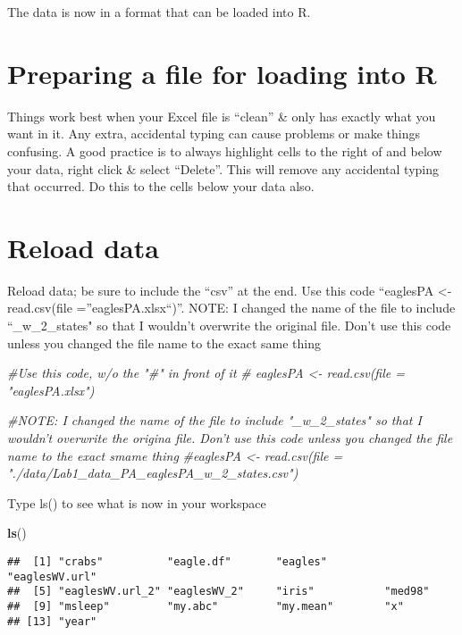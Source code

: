\documentclass[]{book}
\newenvironment{Shaded}{\begin{snugshade}}{\end{snugshade}}
\newcommand{\KeywordTok}[1]{\textcolor[rgb]{0.13,0.29,0.53}{\textbf{#1}}}
\newcommand{\CommentTok}[1]{\textcolor[rgb]{0.56,0.35,0.01}{\textit{#1}}}
\newcommand{\NormalTok}[1]{#1}
\theoremstyle{definition}
\theoremstyle{definition}
\theoremstyle{definition}
\theoremstyle{remark}
\begin{document}
The data is now in a format that can be loaded into R.

\section{Preparing a file for loading into
R}\label{preparing-a-file-for-loading-into-r}

Things work best when your Excel file is ``clean'' \& only has exactly
what you want in it. Any extra, accidental typing can cause problems or
make things confusing. A good practice is to always highlight cells to
the right of and below your data, right click \& select ``Delete''. This
will remove any accidental typing that occurred. Do this to the cells
below your data also.

\section{Reload data}\label{reload-data}

Reload data; be sure to include the ``csv'' at the end. Use this code
``eaglesPA \textless{}- read.csv(file =''eaglesPA.xlsx``)''. NOTE: I
changed the name of the file to include ``\_w\_2\_states" so that I
wouldn't overwrite the original file. Don't use this code unless you
changed the file name to the exact same thing

\begin{Shaded}
\begin{Highlighting}[]
\CommentTok{#Use this code, w/o the "#" in front of it}
\CommentTok{# eaglesPA <- read.csv(file = "eaglesPA.xlsx")}

\CommentTok{#NOTE: I changed the name of the file to include "_w_2_states" so that I wouldn't overwrite the origina file.  Don't use this code unless you changed the file name to the exact smame thing}
\CommentTok{#eaglesPA <- read.csv(file = "./data/Lab1_data_PA_eaglesPA_w_2_states.csv")}
\end{Highlighting}
\end{Shaded}

Type ls() to see what is now in your workspace

\begin{Shaded}
\begin{Highlighting}[]
\KeywordTok{ls}\NormalTok{()}
\end{Highlighting}
\end{Shaded}

\begin{verbatim}
##  [1] "crabs"          "eagle.df"       "eagles"         "eaglesWV.url"  
##  [5] "eaglesWV.url_2" "eaglesWV_2"     "iris"           "med98"         
##  [9] "msleep"         "my.abc"         "my.mean"        "x"             
## [13] "year"
\end{verbatim}
\end{document}
